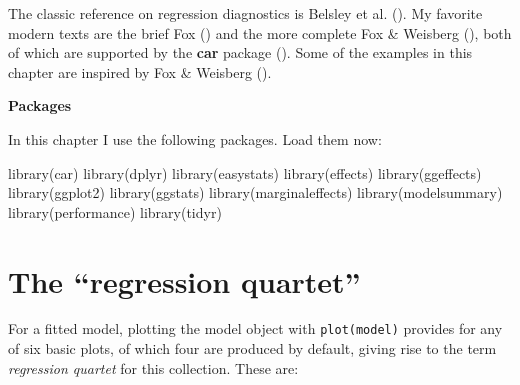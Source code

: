 \documentclass[
  letterpaper,
  10pt,
  krantz2]{krantz}
\makeatletter
\newenvironment{Shaded}{\begin{snugshade}}{\end{snugshade}}
\newcommand{\FunctionTok}[1]{\textcolor[rgb]{0.28,0.35,0.67}{#1}}
\newcommand{\NormalTok}[1]{\textcolor[rgb]{0.00,0.23,0.31}{#1}}
\newenvironment{kframe}{%
  \medskip{}
  \setlength{\fboxsep}{.8em}
  \def\at@end@of@kframe{}%
  \ifinner\ifhmode%
  \def\at@end@of@kframe{\end{minipage}}%
  \begin{minipage}{\columnwidth}%
  \fi\fi%
  \def\FrameCommand##1{\hskip\@totalleftmargin \hskip-\fboxsep
  \colorbox{shadecolor}{##1}\hskip-\fboxsep
      \hskip-\linewidth \hskip-\@totalleftmargin \hskip\columnwidth}%
  \MakeFramed {\advance\hsize-\width
    \@totalleftmargin\z@ \linewidth\hsize
    \@setminipage}}%
{\par\unskip\endMakeFramed%
  \at@end@of@kframe}
\renewenvironment{Shaded}{\begin{kframe}}{\end{kframe}}
\makeatother
\begin{document}
The classic reference on regression diagnostics is Belsley et al.
(). My favorite modern texts are the
brief Fox () and the more complete Fox \&
Weisberg (), both of which are
supported by the \textbf{car} package (). Some of the examples in this chapter are inspired by Fox \&
Weisberg ().

\textbf{Packages}

In this chapter I use the following packages. Load them now:

\begin{Shaded}
\begin{Highlighting}[]
\FunctionTok{library}\NormalTok{(car)}
\FunctionTok{library}\NormalTok{(dplyr)}
\FunctionTok{library}\NormalTok{(easystats)}
\FunctionTok{library}\NormalTok{(effects)}
\FunctionTok{library}\NormalTok{(ggeffects)}
\FunctionTok{library}\NormalTok{(ggplot2)}
\FunctionTok{library}\NormalTok{(ggstats)}
\FunctionTok{library}\NormalTok{(marginaleffects)}
\FunctionTok{library}\NormalTok{(modelsummary)}
\FunctionTok{library}\NormalTok{(performance)}
\FunctionTok{library}\NormalTok{(tidyr)}
\end{Highlighting}
\end{Shaded}

\section{The ``regression quartet''}\label{the-regression-quartet}

For a fitted model, plotting the model object with \texttt{plot(model)}
provides for any of six basic plots, of which four are produced by
default, giving rise to the term \emph{regression quartet} for this
collection. These are:
\end{document}
